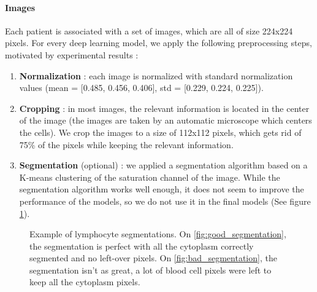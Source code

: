 \documentclass{midl}
\begin{document}
\paragraph*{Images}
Each patient is associated with a set of images, which are all of size 224x224 pixels. For every deep learning model, we apply the following preprocessing steps, motivated by experimental results :
\begin{enumerate}
    \item \textbf{Normalization} : each image is normalized with standard normalization values (mean = [0.485, 0.456, 0.406], std = [0.229, 0.224, 0.225]).
    \item \textbf{Cropping} : in most images, the relevant information is located in the center of the image (the images are taken by an automatic microscope which centers the cells). We crop the images to a size of 112x112 pixels, which gets rid of 75\% of the pixels while keeping the relevant information.
    \item \textbf{Segmentation} (optional) : we applied a segmentation algorithm based on a K-means clustering of the saturation channel of the image. While the segmentation algorithm works well enough, it does not seem to improve the performance of the models, so we do not use it in the final models (See figure \ref{fig:segmentation}).
\end{enumerate}

\begin{figure}[h!]
    \centering
    {
         \qquad
    }
    {\caption{Example of lymphocyte segmentations. On \ref{fig:good_segmentation}, the segmentation is perfect with all the cytoplasm correctly segmented and no left-over pixels. On \ref{fig:bad_segmentation}, the segmentation isn't as great, a lot of blood cell pixels were left to keep all the cytoplasm pixels.\label{fig:segmentation}}}
\end{figure}
\end{document}
